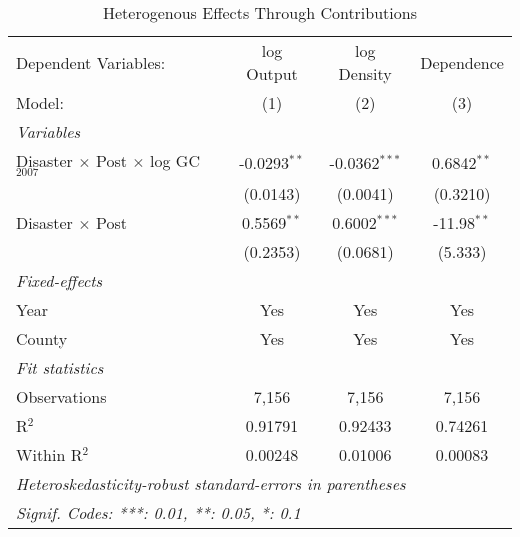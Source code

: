 
\begin{table}[htbp]
   \caption{Heterogenous Effects Through Contributions}
   \centering
   \begin{adjustbox}{max width = \textwidth, center}
      \begin{tabular}{lccc}
         \tabularnewline \midrule \midrule
         Dependent Variables:                              & log Output     & log Density     & Dependence\\  
         Model:                                            & (1)            & (2)             & (3)\\  
         \midrule
         \emph{Variables}\\
         Disaster $\times$ Post $\times$ log GC$_{2007}$   & -0.0293$^{**}$ & -0.0362$^{***}$ & 0.6842$^{**}$\\   
                                                           & (0.0143)       & (0.0041)        & (0.3210)\\   
         Disaster $\times$ Post                            & 0.5569$^{**}$  & 0.6002$^{***}$  & -11.98$^{**}$\\   
                                                           & (0.2353)       & (0.0681)        & (5.333)\\   
         \midrule
         \emph{Fixed-effects}\\
         Year                                              & Yes            & Yes             & Yes\\  
         County                                            & Yes            & Yes             & Yes\\  
         \midrule
         \emph{Fit statistics}\\
         Observations                                      & 7,156          & 7,156           & 7,156\\  
         R$^2$                                             & 0.91791        & 0.92433         & 0.74261\\  
         Within R$^2$                                      & 0.00248        & 0.01006         & 0.00083\\  
         \midrule \midrule
         \multicolumn{4}{l}{\emph{Heteroskedasticity-robust standard-errors in parentheses}}\\
         \multicolumn{4}{l}{\emph{Signif. Codes: ***: 0.01, **: 0.05, *: 0.1}}\\
      \end{tabular}
   \end{adjustbox}
\end{table}


